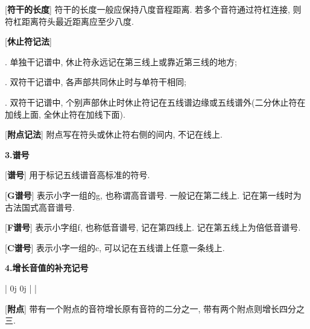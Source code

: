 [\textbf{符干的长度}] 符干的长度一般应保持八度音程距离. 若多个音符通过符杠连接, 则符杠距离符头最近距离应至少八度.\par

[\textbf{休止符记法}] \par
{}. 单独干记谱中, 休止符永远记在第三线上或靠近第三线的地方;\par
{}. 双符干记谱中, 各声部共同休止时与单符干相同;\par
{}. 双符干记谱中, 个别声部休止时休止符记在五线谱边缘或五线谱外(二分休止符在加线上面, 全休止符在加线下面).\par

[\textbf{附点记法}] 附点写在符头或休止符右侧的间内, 不记在线上.\par
\startextract \Notes
{}      \ds \dsp \hp \hpp
\en\zendextract 

\begin{center}
 \textbf{3.谱号}\\
\end{center}

[\textbf{谱号}] 用于标记五线谱音高标准的符号.\par

[\textbf{G谱号}] 表示小字一组的g, 也称谓高音谱号. 一般记在第二线上. 记在第一线时为古法国式高音谱号.\par
{}\treble
\startextract 
\Notes {}
\en\zendextract 

[\textbf{F谱号}] 表示小字组f, 也称低音谱号, 记在第四线上. 记在第五线上为倍低音谱号.\par
{}\bass
\startextract 
\Notes {}
\en\zendextract 

[\textbf{C谱号}] 表示小字一组的c, 可以记在五线谱上任意一条线上.\par
{}\alto
\startextract 
\Notes {}
\en\zendextract 

\clearpage

\begin{center}
 \textbf{4.增长音值的补充记号}\\
\end{center}

\treble
\startextract 
\Notes {}    \hp \dsp \qppp \en\bar
\Notes \isluru0j \tslur0j \en\bar
\Notes {} \ds {}\en\bar
\Notes {} \qp {}\en\doublebar
\Notes {} \ds {}\en\rightrepeat
\zendextract 

[\textbf{附点}] 带有一个附点的音符增长原有音符的二分之一, 带有两个附点则增长四分之三.\par

